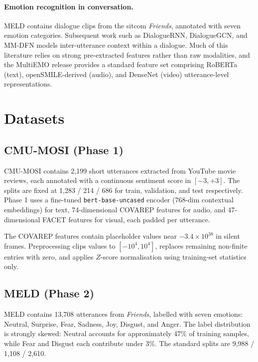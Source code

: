 \documentclass[11pt,twocolumn]{article}
\begin{document}
\paragraph{Emotion recognition in conversation.} MELD \citep{poria2019meld} contains dialogue clips from the sitcom \emph{Friends}, annotated with seven emotion categories. Subsequent work such as DialogueRNN, DialogueGCN, and MM-DFN models inter-utterance context within a dialogue. Much of this literature relies on strong pre-extracted features rather than raw modalities, and the MultiEMO release \citep{shi2023multiemo} provides a standard feature set comprising RoBERTa (text), openSMILE-derived (audio), and DenseNet (video) utterance-level representations.

\section{Datasets}
\label{sec:dataset}

\subsection{CMU-MOSI (Phase 1)}

CMU-MOSI \citep{zadeh2016multimodal} contains 2{,}199 short utterances extracted from YouTube movie reviews, each annotated with a continuous sentiment score in $[-3, +3]$. The splits are fixed at 1{,}283 / 214 / 686 for train, validation, and test respectively. Phase 1 uses a fine-tuned \texttt{bert-base-uncased} encoder (768-dim contextual embeddings) for text, 74-dimensional COVAREP features for audio, and 47-dimensional FACET features for visual, each padded per utterance.

The COVAREP features contain placeholder values near $-3.4 \times 10^{38}$ in silent frames. Preprocessing clips values to $[-10^4, 10^4]$, replaces remaining non-finite entries with zero, and applies $Z$-score normalisation using training-set statistics only.

\subsection{MELD (Phase 2)}

MELD \citep{poria2019meld} contains 13{,}708 utterances from \emph{Friends}, labelled with seven emotions: Neutral, Surprise, Fear, Sadness, Joy, Disgust, and Anger. The label distribution is strongly skewed: Neutral accounts for approximately 47\% of training samples, while Fear and Disgust each contribute under 3\%. The standard splits are 9{,}988 / 1{,}108 / 2{,}610.
\end{document}

